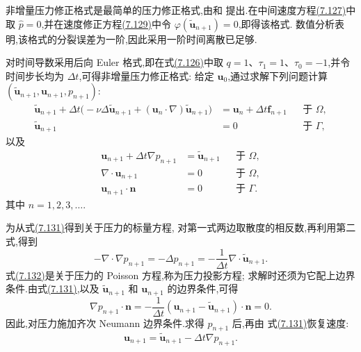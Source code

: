 \begin{example}[非增量压力修正格式]\label{ex:nonincremental-pressure-correction}
非增量压力修正格式是最简单的压力修正格式,由\textcite{Chorin1968}和
\textcite{Temam1969}提出.在中间速度方程\hyperref[eq:projection-intermediate-velocity]{(7.127)}中取 $\widehat p=0$,并在速度修正方程\hyperref[eq:projection-correction-step]{(7.129)}中令 $\varphi(\widetilde{\bm{u}}_{n+1})=0$,即得该格式.
数值分析表明,该格式的分裂误差为一阶,因此采用一阶时间离散已足够.

对时间导数采用后向 Euler 格式,即在式\hyperref[eq:projection-q-step-time-derivative]{(7.126)}中取
$q=1$、$\tau_1=1$、$\tau_0=-1$,并令时间步长均为 $\Delta t$,可得非增量压力修正格式:
给定 $\bm{u}_0$,通过求解下列问题计算
$(\widetilde{\bm{u}}_{n+1},\bm{u}_{n+1},p_{n+1})$:
\begin{equation}\label{eq:nonincremental-velocity-step}
\begin{aligned}
 \widetilde{\bm{u}}_{n+1}
 +\Delta t\bigl(-\nu\Delta\widetilde{\bm{u}}_{n+1}
   +(\bm{u}_n\cdot\nabla)\widetilde{\bm{u}}_{n+1}\bigr)
 &=\bm{u}_n+\Delta t\bm{f}_{n+1}
   &&\text{于 }\Omega,\\
 \widetilde{\bm{u}}_{n+1}&=0
   &&\text{于 }\Gamma,
\end{aligned}
\end{equation}
以及
\begin{equation}\label{eq:nonincremental-pressure-correction-step}
\begin{aligned}
 \bm{u}_{n+1}+\Delta t\nabla p_{n+1}
   &=\widetilde{\bm{u}}_{n+1}
     &&\text{于 }\Omega,\\
 \nabla\cdot\bm{u}_{n+1}&=0
     &&\text{于 }\Omega,\\
 \bm{u}_{n+1}\cdot\bm{n}&=0
     &&\text{于 }\Gamma.
\end{aligned}
\end{equation}
其中 $n=1,2,3,\ldots$.

为从式\hyperref[eq:nonincremental-pressure-correction-step]{(7.131)}得到关于压力的标量方程,
对第一式两边取散度的相反数,再利用第二式,得到
\begin{equation}\label{eq:nonincremental-pressure-poisson}
 -\nabla\cdot\nabla p_{n+1}
 =-\Delta p_{n+1}
 =-\frac{1}{\Delta t}\nabla\cdot\widetilde{\bm{u}}_{n+1}.
\end{equation}
式\hyperref[eq:nonincremental-pressure-poisson]{(7.132)}是关于压力的 Poisson 方程,称为压力投影方程;
求解时还须为它配上边界条件.由式\hyperref[eq:nonincremental-pressure-correction-step]{(7.131)},以及
$\widetilde{\bm{u}}_{n+1}$ 和 $\bm{u}_{n+1}$ 的边界条件,可得
\begin{equation}\label{eq:nonincremental-pressure-neumann}
 \nabla p_{n+1}\cdot\bm{n}
 =-\frac{1}{\Delta t}
   (\bm{u}_{n+1}-\widetilde{\bm{u}}_{n+1})\cdot\bm{n}
 =0.
\end{equation}
因此,对压力施加齐次 Neumann 边界条件.求得 $p_{n+1}$ 后,再由
式\hyperref[eq:nonincremental-pressure-correction-step]{(7.131)}恢复速度:
\begin{equation}\label{eq:nonincremental-velocity-recovery}
 \bm{u}_{n+1}
 =\widetilde{\bm{u}}_{n+1}-\Delta t\nabla p_{n+1}.
\end{equation}
\end{example}

